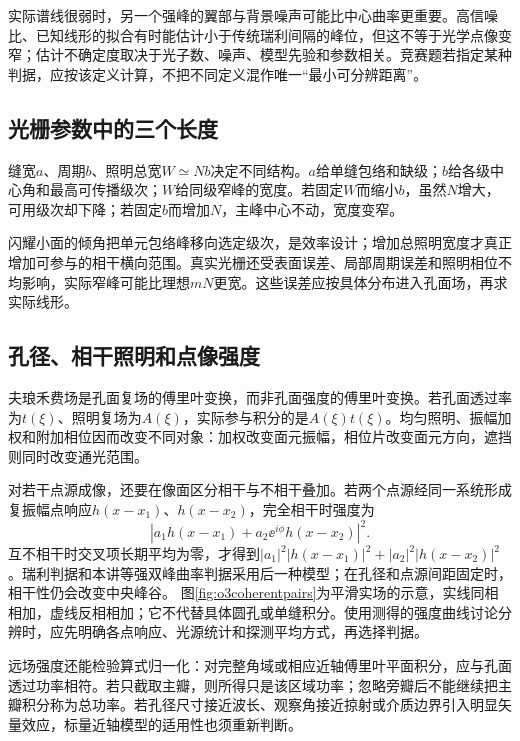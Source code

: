 实际谱线很弱时，另一个强峰的翼部与背景噪声可能比中心曲率更重要。高信噪比、已知线形的拟合有时能估计小于传统瑞利间隔的峰位，但这不等于光学点像变窄；估计不确定度取决于光子数、噪声、模型先验和参数相关。竞赛题若指定某种判据，应按该定义计算，不把不同定义混作唯一“最小可分辨距离”。

\subsection{光栅参数中的三个长度}
缝宽$a$、周期$b$、照明总宽$W\simeq Nb$决定不同结构。$a$给单缝包络和缺级；$b$给各级中心角和最高可传播级次；$W$给同级窄峰的宽度。若固定$W$而缩小$b$，虽然$N$增大，可用级次却下降；若固定$b$而增加$N$，主峰中心不动，宽度变窄。

闪耀小面的倾角把单元包络峰移向选定级次，是效率设计；增加总照明宽度才真正增加可参与的相干横向范围。真实光栅还受表面误差、局部周期误差和照明相位不均影响，实际窄峰可能比理想$mN$更宽。这些误差应按具体分布进入孔面场，再求实际线形。

\subsection{孔径、相干照明和点像强度}
夫琅禾费场是孔面复场的傅里叶变换，而非孔面强度的傅里叶变换。若孔面透过率为$t(\xi)$、照明复场为$A(\xi)$，实际参与积分的是$A(\xi)t(\xi)$。均匀照明、振幅加权和附加相位因而改变不同对象：加权改变面元振幅，相位片改变面元方向，遮挡则同时改变通光范围。

对若干点源成像，还要在像面区分相干与不相干叠加。若两个点源经同一系统形成复振幅点响应$h(x-x_1)$、$h(x-x_2)$，完全相干时强度为
\[
 |a_1h(x-x_1)+a_2\ee^{i\phi}h(x-x_2)|^2.
\]
互不相干时交叉项长期平均为零，才得到$|a_1|^2|h(x-x_1)|^2+|a_2|^2|h(x-x_2)|^2$。瑞利判据和本讲等强双峰曲率判据采用后一种模型；在孔径和点源间距固定时，相干性仍会改变中央峰谷。
图\ref{fig:o3coherentpairs}为平滑实场的示意，实线同相相加，虚线反相相加；它不代替具体圆孔或单缝积分。使用测得的强度曲线讨论分辨时，应先明确各点响应、光源统计和探测平均方式，再选择判据。

远场强度还能检验算式归一化：对完整角域或相应近轴傅里叶平面积分，应与孔面透过功率相符。若只截取主瓣，则所得只是该区域功率；忽略旁瓣后不能继续把主瓣积分称为总功率。若孔径尺寸接近波长、观察角接近掠射或介质边界引入明显矢量效应，标量近轴模型的适用性也须重新判断。
